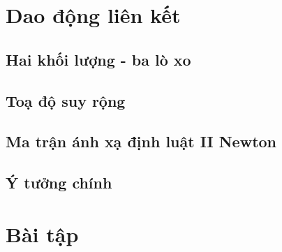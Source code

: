 \documentclass[aspectratio=169, t]{beamer} %
\begin{document}
\section{Dao động liên kết}
\subsection{Hai khối lượng - ba lò xo}


\subsection{Toạ độ suy rộng}


\subsection{Ma trận ánh xạ định luật II Newton}


\subsection{Ý tưởng chính}


\section{Bài tập}







\end{document}

